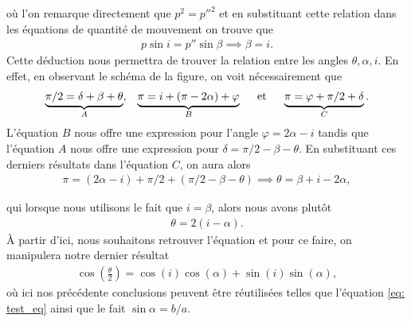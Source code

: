 où l'on remarque directement que $p^2 = p''^2$ et en substituant cette relation dans les équations de quantité de mouvement on trouve que
\begin{align*}
    p\sin i = p''\sin\beta\implies\beta = i.
\end{align*}
Cette déduction nous permettra de trouver la relation entre les
angles $\theta, \alpha, i$. En effet, en observant le schéma de
la figure, on voit nécessairement que
\begin{align*}
    \underbrace{\pi/2 = \delta + \beta + \theta}_A,\;\;\; \underbrace{\pi = i + (\pi - 2\alpha) + \varphi}_B\hspace{0.5cm}\text{et}\hspace{0.5cm} \underbrace{\pi = \varphi + \pi/2 + \delta}_C.
\end{align*}
L'équation $B$ nous offre une expression pour l'angle $\varphi = 2\alpha - i$ tandis que l'équation $A$ nous offre une expression pour $\delta = \pi/2 - \beta - \theta$. En substituant ces derniers résultats dans l'équation $C$, on aura alors
\begin{align*}
    \pi = (2\alpha - i) + \pi/2 + (\pi/2 - \beta - \theta)\implies\theta = \beta + i - 2\alpha,
\end{align*}

qui lorsque nous utilisons le fait que $i = \beta$, alors nous avons
plutôt
\begin{align*}
    \theta = 2(i - \alpha).
\end{align*}
À partir d'ici, nous souhaitons retrouver l'équation et pour ce
faire, on manipulera notre dernier résultat
\begin{align}
    \boxed{
        \cos\left(\frac{\theta}{2}\right) = \cos(i)\cos(\alpha) +
        \sin(i)\sin(\alpha),
    }
    \label{eq: test_eq}
\end{align}
où ici nos précédente conclusions peuvent être réutilisées telles
que l'équation \eqref{eq: test_eq} ainsi que le fait
$\sin\alpha = b/a$. \\

\blindtext[2]

\clearpage
